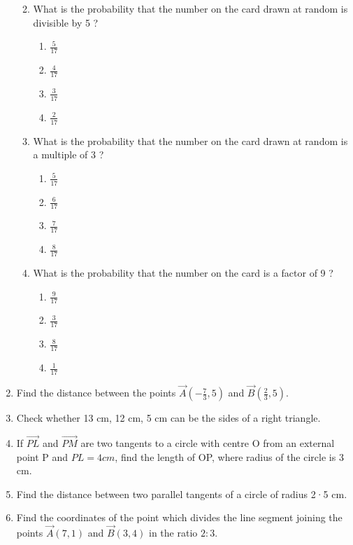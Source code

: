 \documentclass{article}
\begin{document}
\begin{enumerate}
\begin{enumerate}
\begin{enumerate}
	\end{enumerate}
\item What is the probability that the number on the card drawn at random is divisible by 5 ? 
	\begin{enumerate}
	\item $\frac{5}{17}$
	\item $\frac{4}{17}$
	\item $\frac{3}{17}$ 
	\item $\frac{2}{17}$ 
	\end{enumerate}
\item What is the probability that the number on the card drawn at random is a multiple of 3 ? 
	\begin{enumerate}
	\item $\frac{5}{17}$
	\item $\frac{6}{17}$
	\item $\frac{7}{17}$ 
	\item $\frac{8}{17}$ 
	\end{enumerate}
\item What is the probability that the number on the card is a factor of 9 ?
	\begin{enumerate}
	\item $\frac{9}{17}$
	\item $\frac{3}{17}$
	\item $\frac{8}{17}$ 
	\item $\frac{1}{17}$ 
	\end{enumerate}
\end{enumerate}
		
\item Find the distance between the points $ \vec{A} (-\frac{7}{3},5) $ and $ \vec{B} (\frac{2}{3},5) $. 

\item Check whether 13 cm, 12 cm, 5 cm can be the sides of a right triangle.
		
\item If $ \vec{PL} $ and $ \vec{PM} $ are two tangents to a circle with centre O from an external point P and $PL = 4 cm$, find the length of OP, where radius of the circle is 3 cm.
			
\item Find the distance between two parallel tangents of a circle of radius 2·5 cm. 

\item Find the coordinates of the point which divides the line segment joining the points $\vec{A}(7, 1)$ and $\vec{B}( 3, 4)$ in the ratio $2 : 3$. 


\end{enumerate}
\end{document}
